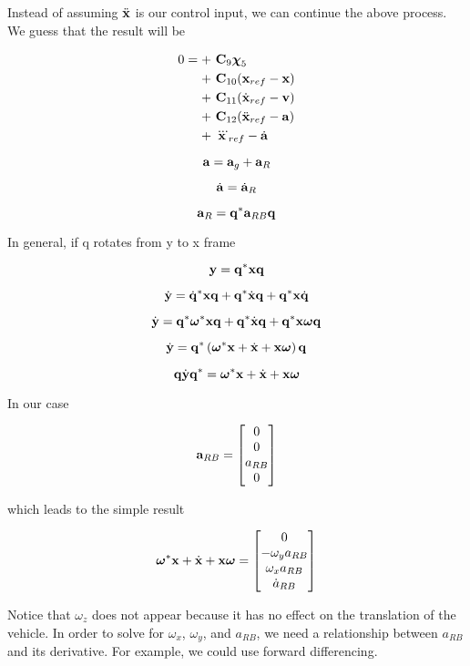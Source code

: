 Instead of assuming $\ddot{\mathbf{x}}$ is our control input, we can continue the above process. We guess that the result will be

\begin{align}\nonumber
0 = + &~ \mathbf{C}_{9} \boldsymbol\chi_5 \\\nonumber
+ &~ \mathbf{C}_{10} (\mathbf{x}_{ref} - \mathbf{x}) \\\nonumber
+ &~ \mathbf{C}_{11} (\dot{\mathbf{x}}_{ref} - \mathbf{v}) \\\nonumber
+ &~ \mathbf{C}_{12} ( \ddot{\mathbf{x}}_{ref} - \mathbf{a} ) \\\nonumber
+ &~ \dddot{\mathbf{x}}_{ref} - \dot{\mathbf{a}}
\end{align}

\[
\mathbf{a} = \mathbf{a}_{g} + \mathbf{a}_{R}
\]

\[
\dot{\mathbf{a}} = \dot{\mathbf{a}}_{R}
\]

\[
\mathbf{a}_R = \mathbf{q}^* \mathbf{a}_{RB} \mathbf{q}
\]

In general, if q rotates from y to x frame

\[
\mathbf{y} = \mathbf{q}^* \mathbf{x} \mathbf{q}
\]

\[
\dot{\mathbf{y}} = \dot{\mathbf{q}}^* \mathbf{x} \mathbf{q} + \mathbf{q}^* \dot{\mathbf{x}} \mathbf{q} + \mathbf{q}^* \mathbf{x} \dot{\mathbf{q}}
\]

\[
\dot{\mathbf{y}} = \mathbf{q}^* \boldsymbol \omega^* \mathbf{x} \mathbf{q} + \mathbf{q}^* \dot{\mathbf{x}} \mathbf{q} + \mathbf{q}^* \mathbf{x} \boldsymbol \omega \mathbf{q}
\]

\[
\dot{\mathbf{y}} = \mathbf{q}^* \left( \boldsymbol \omega^* \mathbf{x} + \dot{\mathbf{x}} + \mathbf{x} \boldsymbol \omega \right) \mathbf{q}
\]

\[
\mathbf{q} \dot{\mathbf{y}} \mathbf{q}^* = \boldsymbol \omega^* \mathbf{x} + \dot{\mathbf{x}} + \mathbf{x} \boldsymbol \omega
\]

In our case



\[
\mathbf{a}_{RB} = \begin{bmatrix} 0 \\ 0 \\ a_{RB} \\ 0 \end{bmatrix}
\]

which leads to the simple result

\[
\boldsymbol \omega^* \mathbf{x} + \dot{\mathbf{x}} + \mathbf{x} \boldsymbol \omega = 
\begin{bmatrix}
0 \\
- \omega_y a_{RB} \\
\omega_x a_{RB} \\
\dot{a}_{RB}
\end{bmatrix}
\]

Notice that $\omega_z$ does not appear because it has no effect on the translation of the vehicle.
In order to solve for $\omega_x$, $\omega_y$, and $a_{RB}$, we need a relationship between $a_{RB}$ and its derivative.
For example, we could use forward differencing.



